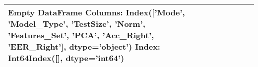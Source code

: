 \begin{tabular}{lllrllrrr}
\toprule
Empty DataFrame
Columns: Index(['Mode', 'Model\_Type', 'TestSize', 'Norm', 'Features\_Set', 'PCA',
       'Acc\_Right', 'EER\_Right'],
      dtype='object')
Index: Int64Index([], dtype='int64') \\
\bottomrule
\end{tabular}
